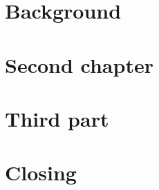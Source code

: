 \documentclass{src/thesis}  %
\author{Author Name}
\begin{document}
 
\thispagestyle{empty}







\cleardoublepage
{}
\tableofcontents

\newpage


\placethumbtrue %
\cleardoublepage
\thispagestyle{empty}
\setcounter{page}{1}
\part{Background}\label{part: intro}


\cleardoublepage
\part{Second chapter}\label{part: design}


\cleardoublepage
\part{Third part}\label{part: something}


\part{Closing}\label{part: closing}

\end{document}

